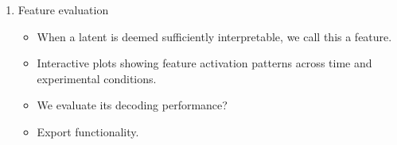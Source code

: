 \begin{enumerate}
    \item Feature evaluation
    \begin{itemize}
        \item When a latent is deemed sufficiently interpretable, we call this a feature.
        \item Interactive plots showing feature activation patterns across time and experimental conditions.
        \item We evaluate its decoding performance?
        \item Export functionality.
    \end{itemize}
\end{enumerate}
